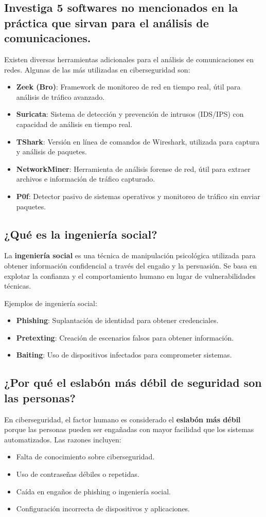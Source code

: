 \subsection{Investiga 5 softwares no mencionados en la práctica que sirvan para el análisis de comunicaciones.}
Existen diversas herramientas adicionales para el análisis de comunicaciones en redes. Algunas de las más utilizadas en ciberseguridad son:
\begin{itemize}
    \item \textbf{Zeek (Bro)}: Framework de monitoreo de red en tiempo real, útil para análisis de tráfico avanzado.
    \item \textbf{Suricata}: Sistema de detección y prevención de intrusos (IDS/IPS) con capacidad de análisis en tiempo real.
    \item \textbf{TShark}: Versión en línea de comandos de Wireshark, utilizada para captura y análisis de paquetes.
    \item \textbf{NetworkMiner}: Herramienta de análisis forense de red, útil para extraer archivos e información de tráfico capturado.
    \item \textbf{P0f}: Detector pasivo de sistemas operativos y monitoreo de tráfico sin enviar paquetes.
\end{itemize}

\subsection{¿Qué es la ingeniería social?}
La \textbf{ingeniería social} es una técnica de manipulación psicológica utilizada para obtener información confidencial a través del engaño y la persuasión. Se basa en explotar la confianza y el comportamiento humano en lugar de vulnerabilidades técnicas.

Ejemplos de ingeniería social:
\begin{itemize}
    \item \textbf{Phishing}: Suplantación de identidad para obtener credenciales.
    \item \textbf{Pretexting}: Creación de escenarios falsos para obtener información.
    \item \textbf{Baiting}: Uso de dispositivos infectados para comprometer sistemas.
\end{itemize}

\subsection{¿Por qué el eslabón más débil de seguridad son las personas?}
En ciberseguridad, el factor humano es considerado el \textbf{eslabón más débil} porque las personas pueden ser engañadas con mayor facilidad que los sistemas automatizados. Las razones incluyen:
\begin{itemize}
    \item Falta de conocimiento sobre ciberseguridad.
    \item Uso de contraseñas débiles o repetidas.
    \item Caída en engaños de phishing o ingeniería social.
    \item Configuración incorrecta de dispositivos y aplicaciones.
\end{itemize}

